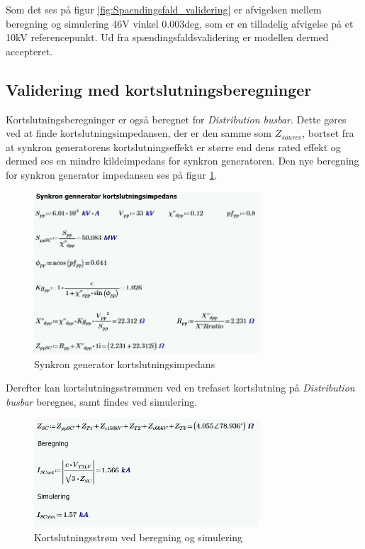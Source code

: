  Som det ses på figur \ref{fig:Spaendingsfald_validering} er afvigelsen mellem beregning og simulering 46V vinkel 0.003deg, som er en tilladelig afvigelse på et 10kV referencepunkt. Ud fra spændingsfaldsvalidering er modellen dermed accepteret.
 
\subsection{Validering med kortslutningsberegninger}
Kortslutningsberegninger er også beregnet for \textit{Distribution busbar}. Dette gøres ved at finde kortslutningsimpedansen, der er den samme som $Z_{source}$, bortset fra at synkron generatorens kortslutningseffekt er større end dens rated effekt og dermed ses en mindre kildeimpedans for synkron generatoren. Den nye beregning for synkron generator impedansen ses på figur \ref{fig:SGimpedansSC}.

\begin{figure}[H] %
	\centering
	\includegraphics[width=0.75\textwidth]{figurer/Synkron_generator_valideringSC}
	\caption{Synkron generator kortslutningsimpedans}
	\label{fig:SGimpedansSC}
\end{figure}

Derefter kan kortslutningsstrømmen ved en trefaset kortslutning på \textit{Distribution busbar} beregnes, samt findes ved simulering.

\begin{figure}[H] %
	\centering
	\includegraphics[width=0.75\textwidth]{figurer/Kortslutningsstroem_validering}
	\caption{Kortslutningsstrøm ved beregning og simulering}
	\label{fig:SCvalidering}
\end{figure}

